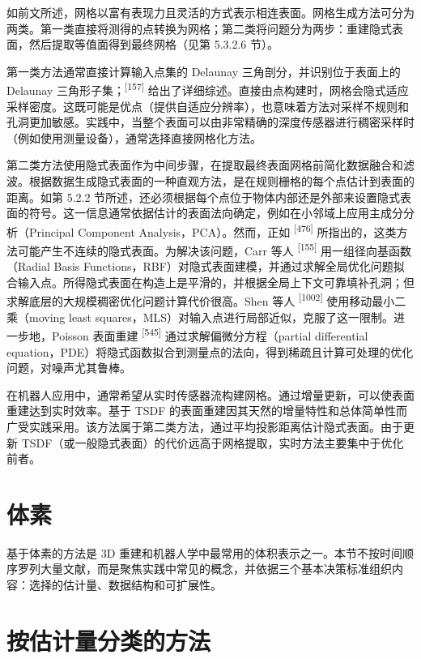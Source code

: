 如前文所述，网格以富有表现力且灵活的方式表示相连表面。网格生成方法可分为两类。第一类直接将测得的点转换为网格；第二类将问题分为两步：重建隐式表面，然后提取等值面得到最终网格（见第 5.3.2.6 节）。

第一类方法通常直接计算输入点集的 Delaunay 三角剖分，并识别位于表面上的 Delaunay 三角形子集；\textsuperscript{[157]} 给出了详细综述。直接由点构建时，网格会隐式适应采样密度。这既可能是优点（提供自适应分辨率），也意味着方法对采样不规则和孔洞更加敏感。实践中，当整个表面可以由非常精确的深度传感器进行稠密采样时（例如使用测量设备），通常选择直接网格化方法。

第二类方法使用隐式表面作为中间步骤，在提取最终表面网格前简化数据融合和滤波。根据数据生成隐式表面的一种直观方法，是在规则栅格的每个点估计到表面的距离。如第 5.2.2 节所述，还必须根据每个点位于物体内部还是外部来设置隐式表面的符号。这一信息通常依据估计的表面法向确定，例如在小邻域上应用主成分分析（Principal Component Analysis，PCA）。然而，正如 \textsuperscript{[476]} 所指出的，这类方法可能产生不连续的隐式表面。为解决该问题，Carr 等人 \textsuperscript{[155]} 用一组径向基函数（Radial Basis Functions，RBF）对隐式表面建模，并通过求解全局优化问题拟合输入点。所得隐式表面在构造上是平滑的，并根据全局上下文可靠填补孔洞；但求解底层的大规模稠密优化问题计算代价很高。Shen 等人 \textsuperscript{[1002]} 使用移动最小二乘（moving least squares，MLS）对输入点进行局部近似，克服了这一限制。进一步地，Poisson 表面重建 \textsuperscript{[545]} 通过求解偏微分方程（partial differential equation，PDE）将隐式函数拟合到测量点的法向，得到稀疏且计算可处理的优化问题，对噪声尤其鲁棒。

在机器人应用中，通常希望从实时传感器流构建网格。通过增量更新，可以使表面重建达到实时效率。基于 TSDF 的表面重建因其天然的增量特性和总体简单性而广受实践采用。该方法属于第二类方法，通过平均投影距离估计隐式表面。由于更新 TSDF（或一般隐式表面）的代价远高于网格提取，实时方法主要集中于优化前者。

\section{体素}

基于体素的方法是 3D 重建和机器人学中最常用的体积表示之一。本节不按时间顺序罗列大量文献，而是聚焦实践中常见的概念，并依据三个基本决策标准组织内容：选择的估计量、数据结构和可扩展性。

\section{按估计量分类的方法}

